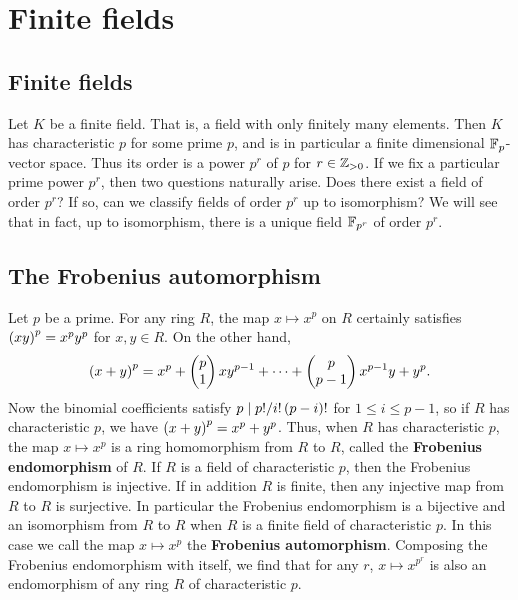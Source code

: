 \pagebreak

\section{Finite fields}

\subsection{Finite fields}


Let $ K $ be a finite field. That is, a field with only finitely many elements. Then $ K $ has characteristic $ p $ for some prime $ p $, and is in particular a finite dimensional $ \mathbb{F}_p $-vector space. Thus its order is a power $ p^r $ of $ p $ for $ r \in \mathbb{Z}_{> 0} $. If we fix a particular prime power $ p^r $, then two questions naturally arise. Does there exist a field of order $ p^r $? If so, can we classify fields of order $ p^r $ up to isomorphism? We will see that in fact, up to isomorphism, there is a unique field $ \mathbb{F}_{p^r} $ of order $ p^r $.

\subsection{The Frobenius automorphism}

Let $ p $ be a prime. For any ring $ R $, the map $ x \mapsto x^p $ on $ R $ certainly satisfies $ \br{xy}^p = x^py^p $ for $ x, y \in R $. On the other hand,
$$ \br{x + y}^p = x^p + \twobyone{p}{1}xy^{p - 1} + \dots + \twobyone{p}{p - 1}x^{p - 1}y + y^p. $$
Now the binomial coefficients satisfy $ p \mid p! / i!\br{p - i}! $ for $ 1 \le i \le p - 1 $, so if $ R $ has characteristic $ p $, we have $ \br{x + y}^p = x^p + y^p $. Thus, when $ R $ has characteristic $ p $, the map $ x \mapsto x^p $ is a ring homomorphism from $ R $ to $ R $, called the \textbf{Frobenius endomorphism} of $ R $. If $ R $ is a field of characteristic $ p $, then the Frobenius endomorphism is injective. If in addition $ R $ is finite, then any injective map from $ R $ to $ R $ is surjective. In particular the Frobenius endomorphism is a bijective and an isomorphism from $ R $ to $ R $ when $ R $ is a finite field of characteristic $ p $. In this case we call the map $ x \mapsto x^p $ the \textbf{Frobenius automorphism}. Composing the Frobenius endomorphism with itself, we find that for any $ r $, $ x \mapsto x^{p^r} $ is also an endomorphism of any ring $ R $ of characteristic $ p $.

